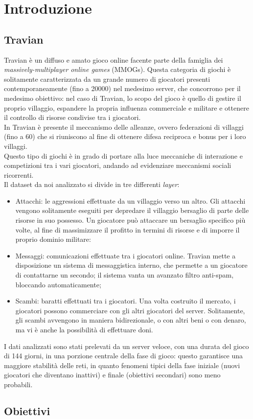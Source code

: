 \chapter{Introduzione}
\section{Travian}
Travian è un diffuso e amato gioco online facente parte della famiglia dei \textit{massively-multiplayer online games} (MMOGs).
Questa categoria di giochi è solitamente caratterizzata da un grande numero di giocatori presenti contemporaneamente (fino a 20000) nel medesimo server, che concorrono per il medesimo obiettivo: nel caso di Travian, lo scopo del gioco è quello di gestire il proprio villaggio, espandere la propria influenza commerciale e militare e ottenere il controllo di risorse condivise tra i giocatori.\\
In Travian è presente il meccanismo delle alleanze, ovvero federazioni di villaggi (fino a 60) che si riuniscono al fine di ottenere difesa reciproca e bonus per i loro villaggi.\\
Questo tipo di giochi è in grado di portare alla luce meccaniche di interazione e competizioni tra i vari giocatori, andando ad evidenziare meccanismi sociali ricorrenti.\\
Il dataset da noi analizzato si divide in tre differenti \textit{layer}:

\begin{itemize}
	\item Attacchi: le aggressioni effettuate da un villaggio verso un altro. Gli attacchi vengono solitamente eseguiti per depredare il villaggio bersaglio di parte delle risorse in suo possesso. Un giocatore può attaccare un bersaglio specifico più volte, al fine di massimizzare il profitto in termini di risorse e di imporre il proprio dominio militare:
	\item Messaggi: comunicazioni effettuate tra i giocatori online. Travian mette a disposizione un sistema di messaggistica interno, che permette a un giocatore di contattarne un secondo; il sistema vanta un avanzato filtro anti-spam, bloccando automaticamente;
	\item Scambi: baratti effettuati tra i giocatori. Una volta costruito il mercato, i giocatori possono commerciare con gli altri giocatori del server. Solitamente, gli scambi avvengono in maniera bidirezionale, o con altri beni o con denaro, ma vi è anche la possibilità di effettuare doni.
\end{itemize}
I dati analizzati sono stati prelevati da un server veloce, con una durata del gioco di 144 giorni, in una porzione centrale della fase di gioco: questo garantisce una maggiore stabilità delle reti, in quanto fenomeni tipici della fase iniziale (nuovi giocatori che diventano inattivi) e finale (obiettivi secondari) sono meno probabili.

\section{Obiettivi}
